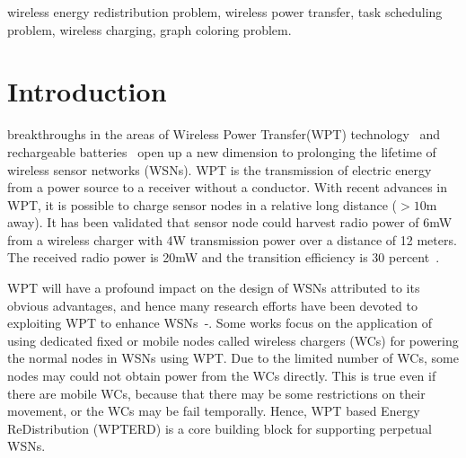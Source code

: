 \documentclass[journal,10pt]{IEEEtran}
\begin{document}
\begin{IEEEkeywords}
wireless energy redistribution problem, wireless power transfer, task scheduling problem, wireless charging, graph coloring problem.
\end{IEEEkeywords}


\IEEEpeerreviewmaketitle



\section{Introduction}
\label{sec_intro}
\newtheorem{lemma}{\textbf{Lemma}}
\newtheorem{theorem}{\textbf{Theorem}}
\newtheorem{property}{\textbf{P}}
\newtheorem{corollary}{\textbf{Corollary}}
%
%
%
%

 breakthroughs in the areas of Wireless Power Transfer(WPT) technology~\cite{Kurs2007, Cannon2009} and rechargeable batteries~\cite{Kang2006} open up a new dimension to prolonging the lifetime of wireless sensor networks (WSNs). WPT is the transmission of electric energy from a power source to a receiver without a conductor. With recent advances in WPT, it is possible to charge sensor nodes in a relative long distance ($>10$m away)\cite{Guo2017}. It has been validated that sensor node could harvest radio power of 6mW from a wireless charger with 4W transmission power over a distance of 12 meters. The received radio power is 20mW and the transition efficiency is 30 percent~\cite{Nintana2012}.

WPT will have a profound impact on the design of WSNs attributed to its obvious advantages, and hence many research efforts have been devoted to exploiting WPT to enhance WSNs~\cite{Xiang2013}-\cite{Madhja2017}. Some works focus on the application of using dedicated fixed or mobile nodes called wireless chargers (WCs) for powering the normal nodes in WSNs using WPT. Due to the limited number of WCs, some nodes may could not obtain power from the WCs directly. This is true even if there are mobile WCs, because that there may be some restrictions on their movement, or the WCs may be fail temporally. Hence, WPT based Energy ReDistribution (WPTERD) is a core building block for supporting perpetual WSNs.
\end{document}
